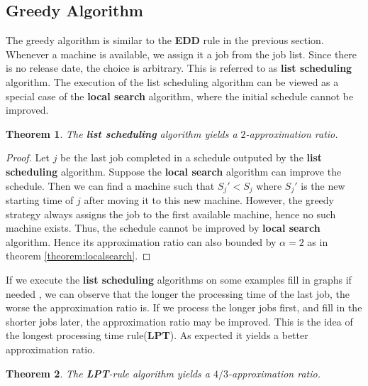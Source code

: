 \documentclass[11pt,psfig,times]{article}
\newtheorem{theorem}{Theorem}
\begin{document}
\subsection{Greedy Algorithm}
The greedy algorithm is similar to the \textbf{EDD} rule in the previous section. Whenever a machine is available, 
we assign it a job from the job list. Since there is no release date, the choice is arbitrary. 
This is referred to as \textbf{list scheduling} algorithm. The execution of the list scheduling algorithm can 
be viewed as a special case of the \textbf{local search} algorithm, where the initial schedule cannot be improved.
\begin{theorem}
    The \textbf{list scheduling} algorithm yields a $2$-approximation ratio.
\end{theorem}
\begin{proof}
    Let $j$ be the last job completed in a schedule outputed by the \textbf{list scheduling} algorithm. 
    Suppose the \textbf{local search} algorithm can improve the schedule. 
    Then we can find a machine such that $S_j' < S_j$ where $S_j'$ is the new starting time of $j$ after moving it to 
    this new machine. However, the greedy strategy always assigns the job to the first available machine, hence 
    no such machine exists. Thus, the schedule cannot be improved by \textbf{local search} algorithm. 
    Hence its approximation ratio can also bounded by $\alpha = 2$ as in theorem \cref{theorem:localsearch}.
\end{proof}
If we execute the \textbf{list scheduling} algorithms on some examples \color{red} fill in graphs if needed \color{black}, we can observe that the longer the processing time of the last job, 
the worse the approximation ratio is. If we process the longer jobs first, and fill in the shorter jobs later,
the approximation ratio may be improved. This is the idea of the longest processing time rule(\textbf{LPT}).
As expected it yields a better approximation ratio. 
\begin{theorem}
    The \textbf{LPT}-rule algorithm yields a $4/3$-approximation ratio.
\end{theorem}
\end{document}
